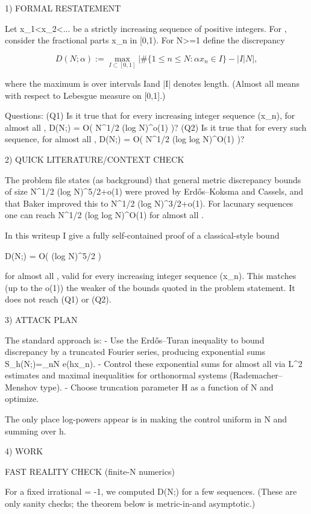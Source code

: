 
1) FORMAL RESTATEMENT

Let x_1<x_2<... be a strictly increasing sequence of positive integers.
For \alpha\in[0,1], consider the fractional parts {\alpha x_n} in [0,1).
For N>=1 define the discrepancy

\[
  D(N;\alpha) := \max_{I\subset[0,1]} \left| \#\{1\le n\le N : {\alpha x_n}\in I\} - |I| N \right|,
\]

where the maximum is over intervals I\subset[0,1] and |I| denotes length.
(Almost all \alpha means with respect to Lebesgue measure on [0,1].)

Questions:
  (Q1) Is it true that for every increasing integer sequence (x_n), for almost all \alpha,
        D(N;\alpha) = O( N^{1/2} (log N)^{o(1)} )?
  (Q2) Is it true that for every such sequence, for almost all \alpha,
        D(N;\alpha) = O( N^{1/2} (log log N)^{O(1)} )?

2) QUICK LITERATURE/CONTEXT CHECK

The problem file states (as background) that general metric discrepancy bounds of size
N^{1/2} (log N)^{5/2+o(1)} were proved by Erd\H{o}s--Koksma and Cassels, and that Baker
improved this to N^{1/2} (log N)^{3/2+o(1)}. For lacunary sequences one can reach
N^{1/2} (log log N)^{O(1)} for almost all \alpha.

In this writeup I give a fully self-contained proof of a classical-style bound

  D(N;\alpha) = O(  (log N)^{5/2} )

for almost all \alpha, valid for every increasing integer sequence (x_n).
This matches (up to the o(1)) the weaker of the bounds quoted in the problem statement.
It does not reach (Q1) or (Q2).

3) ATTACK PLAN

The standard approach is:
- Use the Erd\H{o}s--Turan inequality to bound discrepancy by a truncated Fourier series,
  producing exponential sums S_h(N;\alpha)=\sum_{n\le N} e(h\alpha x_n).
- Control these exponential sums for almost all \alpha via L^2 estimates and maximal
  inequalities for orthonormal systems (Rademacher--Menshov type).
- Choose truncation parameter H as a function of N and optimize.

The only place log-powers appear is in making the control uniform in N and summing over h.

4) WORK

FAST REALITY CHECK (finite-N numerics)

For a fixed irrational \alpha = -1, we computed D(N;\alpha) for a few sequences.
(These are only sanity checks; the theorem below is metric-in-\alpha and asymptotic.)

